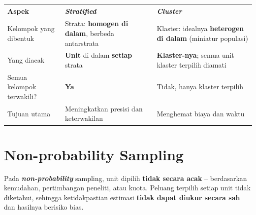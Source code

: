 \documentclass[
  indonesian,
  letterpaper,
]{book}
\newcounter{none} %
\begin{document}
{\def\LTcaptype{none} %
\begin{longtable}[]{@{}
  >{\raggedright\arraybackslash}p{}
  >{\raggedright\arraybackslash}p{}
  >{\raggedright\arraybackslash}p{}@{}}
\toprule\noalign{}
\begin{minipage}[b]{\linewidth}\raggedright
Aspek
\end{minipage} & \begin{minipage}[b]{\linewidth}\raggedright
\emph{Stratified}
\end{minipage} & \begin{minipage}[b]{\linewidth}\raggedright
\emph{Cluster}
\end{minipage} \\
\midrule\noalign{}
\endhead
\bottomrule\noalign{}
\endlastfoot
Kelompok yang dibentuk & Strata: \textbf{homogen di dalam}, berbeda
antarstrata & Klaster: idealnya \textbf{heterogen di dalam} (miniatur
populasi) \\
Yang diacak & \textbf{Unit} di dalam \textbf{setiap} strata &
\textbf{Klaster-nya}; semua unit klaster terpilih diamati \\
Semua kelompok terwakili? & \textbf{Ya} & Tidak, hanya klaster
terpilih \\
Tujuan utama & Meningkatkan presisi dan keterwakilan & Menghemat biaya
dan waktu \\
\end{longtable}
}

\section{Non-probability Sampling}\label{non-probability-sampling}

Pada \textbf{\emph{non-probability}} sampling, unit dipilih
\textbf{tidak secara acak} -- berdasarkan kemudahan, pertimbangan
peneliti, atau kuota. Peluang terpilih setiap unit tidak diketahui,
sehingga ketidakpastian estimasi \textbf{tidak dapat diukur secara sah}
dan hasilnya berisiko bias.
\end{document}
